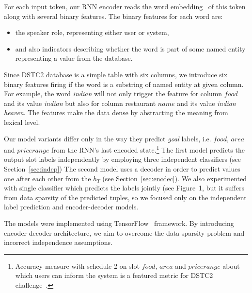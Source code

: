 \documentclass{itatnew}
\begin{document}
For each input token, our RNN encoder reads the word embedding~\cite{bengio2003neural} of this token along with several binary features. 
The binary features for each word are:
\begin{itemize}
	\item the speaker role, representing either user or system,
    \item and also indicators describing whether the word is part of some named entity representing a value from the database.
\end{itemize}
Since DSTC2 database is a simple table with six columns, we introduce six binary features firing if the word is a substring of named entity at given column.
For example, the word {\it indian} will not only trigger the feature for column $food$ and its value {\it indian} but also for column restaurant $name$ and its value {\it indian heaven}.
The features make the data dense by abstracting the meaning from lexical level. 

Our model variants differ only in the way they predict {\it goal} labels, i.e. $food$, $area$ and $price range$ from the RNN's last encoded state.\footnote{Accuracy measure with schedule 2 on slot $food$, $area$ and $price range$ about which users can inform the system is a featured metric for DSTC2 challenge~\cite{henderson2014second}.} 
The first model predicts the output slot labels independently by employing three independent classifiers (see Section~\ref{sec:indep})
The second model uses a decoder in order to predict values one after each other from the $h_{T}$ (see Section~\ref{sec:encdec}).
We also experimented with single classifier which predicts the labels jointly (see Figure~1, but it suffers from data sparsity of the predicted tuples, so we focused only on the independent label prediction and encoder-decoder models.

The models were implemented using TensorFlow~\cite{abaditensorflow} framework. 
By introducing encoder-decoder architecture, we aim to overcome the data sparsity problem and incorrect independence assumptions.
\end{document}
